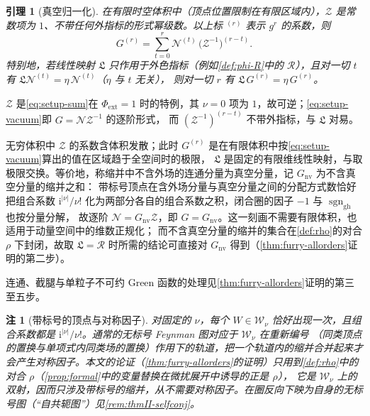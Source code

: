 \documentclass[UTF8,a4paper,11pt,fontset=fandol]{ctexart}
\makeatletter
\theoremstyle{cplain}
\newtheorem{lemma}[theorem]{引理}
\theoremstyle{cdefinition}
\theoremstyle{cremark}
\newtheorem{remark}[theorem]{注}
\renewcommand{\proofname}{证明}
\renewenvironment{proof}[1][\proofname]{\par\pushQED{\qed}\normalfont\topsep6\p@\@plus6\p@\relax
  \trivlist\item[\hskip\labelsep\itshape #1\hspace{0.5em}]\ignorespaces}{\popQED\endtrivlist\@endpefalse}
\numberwithin{equation}{section}
\newcommand{\Rop}{\mathcal{R}}                       %
\newcommand{\ii}{\mathrm{i}}                        %
\makeatother
\begin{document}
\begin{lemma}[真空归一化]\label{lem:setup-vacuum}
在有限时空体积中（顶点位置限制在有限区域内），$\mathcal Z$ 是常数项为 $1$、不带任何外指标的形式幂级数。以上标 ${}^{(r)}$ 表示 $g^r$ 的系数，则
\begin{equation}\label{eq:setup-vacuum}
G^{(r)}=\sum_{t=0}^{r}\mathcal N^{(t)}\,\bigl(\mathcal Z^{-1}\bigr)^{(r-t)} .
\end{equation}
特别地，若线性映射 $\mathfrak L$ 只作用于外色指标（例如\cref{def:phi-R}中的 $\Rop$），且对一切 $t$ 有 $\mathfrak L\mathcal N^{(t)}=\eta\,\mathcal N^{(t)}$（$\eta$ 与 $t$ 无关），
则对一切 $r$ 有 $\mathfrak L\,G^{(r)}=\eta\,G^{(r)}$。
\end{lemma}

\begin{proof}
$\mathcal Z$ 是\cref{eq:setup-sum}在 $\Phi_{\mathrm{ext}}=1$ 时的特例，其 $\nu=0$ 项为 $1$，故可逆；\cref{eq:setup-vacuum}即 $G=\mathcal N\mathcal Z^{-1}$ 的逐阶形式，
而 $(\mathcal Z^{-1})^{(r-t)}$ 不带外指标，与 $\mathfrak L$ 对易。

无穷体积中 $\mathcal Z$ 的系数含体积发散；此时 $G^{(r)}$ 是在有限体积中按\cref{eq:setup-vacuum}算出的值在区域趋于全空间时的极限，
$\mathfrak L$ 是固定的有限维线性映射，与取极限交换。等价地，称缩并中不含外场的连通分量为真空分量，记 $G_{\mathrm{nv}}$ 为不含真空分量的缩并之和：
带标号顶点在含外场分量与真空分量之间的分配方式数恰好把组合系数 $\ii^{|\nu|}/\nu!$ 化为两部分各自的组合系数之积，闭合圈的因子 $-1$ 与 $\operatorname{sgn}_{\mathrm{gh}}$ 也按分量分解，
故逐阶 $\mathcal N=G_{\mathrm{nv}}\mathcal Z$，即 $G=G_{\mathrm{nv}}$。这一刻画不需要有限体积，也适用于动量空间中的维数正规化；
而不含真空分量的缩并的集合在\cref{def:rho}的对合 $\rho$ 下封闭，故取 $\mathfrak L=\Rop$ 时所需的结论可直接对 $G_{\mathrm{nv}}$ 得到（\cref{thm:furry-allorders}证明的第二步）。
\end{proof}

连通、截腿与单粒子不可约 Green 函数的处理见\cref{thm:furry-allorders}证明的第三至五步。

\begin{remark}[带标号的顶点与对称因子]\label{rem:setup-symmetry}
对固定的 $\nu$，每个 $W\in\mathcal W_\nu$ 恰好出现一次，且组合系数都是 $\ii^{|\nu|}/\nu!$。通常的无标号 Feynman 图对应于 $\mathcal W_\nu$ 在重新编号
（同类顶点的置换与单项式内同类场的置换）作用下的轨道，把一个轨道内的缩并合并起来才会产生对称因子。本文的论证（\cref{thm:furry-allorders}的证明）只用到\cref{def:rho}中的对合 $\rho$（\cref{prop:formal}中的变量替换在微扰展开中诱导的正是 $\rho$），
它是 $\mathcal W_\nu$ 上的双射，因而\emph{只涉及带标号的缩并，从不需要对称因子}。在圈反向下映为自身的无标号图（“自共轭图”）见\cref{rem:thmII-selfconj}。
\end{remark}
\end{document}
